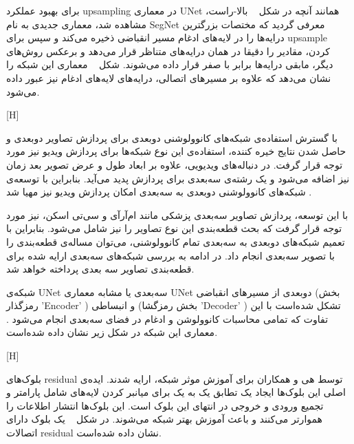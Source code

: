 برای بهبود عملکرد upsampling در معماری UNet همانند آنچه در شکل ~ بالا-راست، مشاهده شد، معماری جدیدی به نام SegNet معرفی گردید  که مختصات بزرگترین درایه‌ها را در لایه‌های ادغام مسیر انقباضی ذخیره می‌کند و سپس برای upsample کردن، مقادیر را دقیقا در همان درایه‌های متناظر قرار می‌دهد و برعکس روش‌های دیگر، مابقی درایه‌ها برابر با صفر قرار داده می‌شوند. شکل ~ معماری این شبکه را نشان می‌دهد که علاوه بر مسیرهای اتصالی، درایه‌های لایه‌های ادغام نیز عبور داده می‌شود.

[H]

با گسترش استفاده‌ی شبکه‌های کانوولوشنی دوبعدی برای پردازش تصاویر دوبعدی و حاصل شدن نتایج خیره کننده، استفاده‌ی این نوع شبکه‌ها برای پردازش ویدیو نیز مورد توجه قرار گرفت. در دنباله‌های ویدیویی، علاوه بر ابعاد طول و عرض تصویر بعد زمان نیز اضافه می‌شود و یک رشته‌ی سه‌بعدی برای پردازش پدید می‌آید. بنابراین با توسعه‌ی شبکه‌های کانوولوشنی دو‌بعدی به سه‌بعدی امکان پردازش ویدیو نیز مهیا شد .

با این توسعه، پردازش تصاویر سه‌بعدی پزشکی مانند ام‌آرآی و سی‌تی اسکن، نیز مورد توجه قرار گرفت که بحث قطعه‌بندی این نوع تصاویر را نیز شامل می‌شود. بنابراین با تعمیم شبکه‌های دوبعدی به سه‌بعدی تمام کانوولوشنی، می‌توان مساله‌ی قطعه‌بندی را با تصویر سه‌بعدی انجام داد. در ادامه به بررسی شبکه‌های سه‌بعدی ارایه شده برای قطعه‌بندی تصاویر سه بعدی پرداخته خواهد شد.

شبکه‌ی UNet سه‌بعدی یا  مشابه معماری UNet دوبعدی از مسیر‌های انقباضی (بخش رمزگذار 'Encoder' ) و انبساطی (بخش رمزگشا 'Decoder' ) تشکل‌ شده‌است با این تفاوت که تمامی محاسبات کانوولوشن و ادغام در فضای سه‌بعدی انجام می‌شود . معماری این شبکه در شکل زیر نشان داده شده‌است.

[H]

بلوک‌های residual توسط هی و همکاران  برای آموزش موثر شبکه، ارایه شدند. ایده‌ی اصلی این بلوک‌ها ایجاد یک تطابق یک‌ به یک برای میانبر کردن لایه‌های شامل پارامتر و تجمیع ورودی و خروجی در انتهای این بلوک است. این بلوک‌ها انتشار اطلاعات را هموارتر می‌کنند و باعث آموزش بهتر شبکه می‌شوند. در شکل ~ یک بلوک دارای اتصالات residual نشان داده شده‌است.

